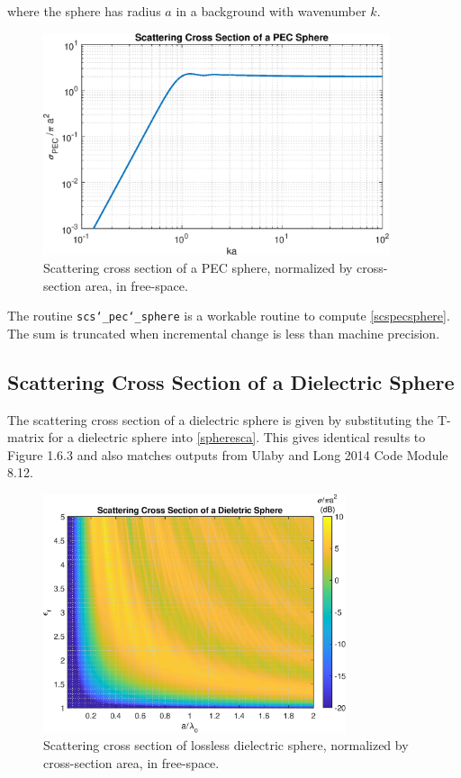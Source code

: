 \noindent where the sphere has radius $a$ in a background with wavenumber $k$.

\begin{figure}[H] 
   \centering
   \includegraphics[width=4in]{Tmatrix/Figures/scspecsphere} 
   \caption{Scattering cross section of a PEC sphere, normalized by cross-section area, in free-space.}
   \label{scspecsph}
\end{figure}




The routine \texttt{scs\char`_pec\char`_sphere} is a workable routine to compute \eqref{scspecsphere}. The sum is truncated when incremental change is less than machine precision. 

{\footnotesize
{}
}

\subsection{Scattering Cross Section of a Dielectric Sphere}

The scattering cross section of a dielectric sphere is given by substituting the T-matrix for a dielectric sphere into \eqref{spheresca}. This gives identical results to \cite{tsang2000scattering} Figure 1.6.3 and also matches outputs from Ulaby and Long 2014 Code Module 8.12.


\begin{figure}[H] 
   \centering
   \includegraphics[width=3.5in]{Tmatrix/Figures/scsdielectricspheregrid} 
   \caption{Scattering cross section of lossless dielectric sphere, normalized by cross-section area, in free-space.}
      \label{scsdiesphall}
\end{figure}

